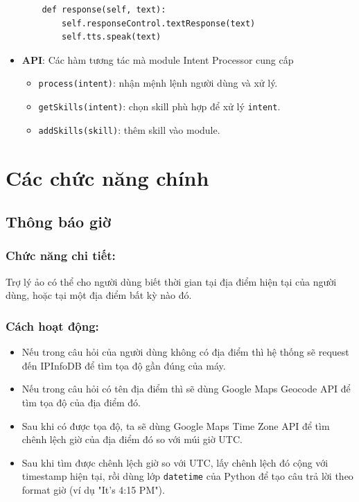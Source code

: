 \begin{itemize}
\begin{lstlisting}
    def response(self, text):
        self.responseControl.textResponse(text)
        self.tts.speak(text)
\end{lstlisting}
\item \textbf{API}: Các hàm tương tác mà module Intent Processor cung cấp
\begin{itemize}
\item \lstinline{process(intent)}: nhận mệnh lệnh người dùng và xử lý.
\item \lstinline{getSkills(intent)}: chọn skill phù hợp để xử lý \lstinline{intent}.
\item \lstinline{addSkills(skill)}: thêm skill vào module.
\end{itemize}
\end{itemize}

\section{Các chức năng chính}

\subsection{Thông báo giờ}

\subsubsection{Chức năng chi tiết:}

Trợ lý ảo có thể cho người dùng biết thời gian tại địa điểm hiện tại của người dùng, hoặc tại một địa điểm bất kỳ nào đó.

\subsubsection{Cách hoạt động:}

\begin{itemize}
    \item Nếu trong câu hỏi của người dùng không có địa điểm thì hệ thống sẽ request đến IPInfoDB để tìm tọa độ gần đúng của máy.
    \item Nếu trong câu hỏi có tên địa điểm thì sẽ dùng Google Maps Geocode API để tìm tọa độ của địa điểm đó.
    \item Sau khi có được tọa độ, ta sẽ dùng Google Maps Time Zone API để tìm chênh lệch giờ của địa điểm đó so với múi giờ UTC.
    \item Sau khi tìm được chênh lệch giờ so với UTC, lấy chênh lệch đó cộng với timestamp hiện tại, rồi dùng lớp \lstinline{datetime} của Python để tạo câu trả lời theo format giờ (ví dụ "It's 4:15 PM").
\end{itemize}

